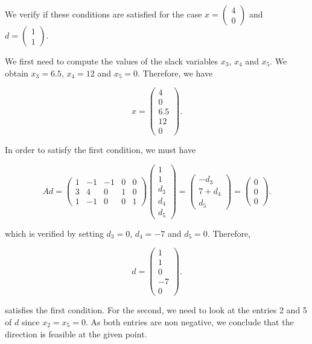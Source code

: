\begin{enumerate}
  We verify if these conditions are satisfied for the case  $x= \begin{pmatrix}
    4 \\
    0
  \end{pmatrix}$
  and
  $d=  \begin{pmatrix}
    1 \\
    1
  \end{pmatrix}.$

  We first need to compute the values of the slack variables $x_3$,  $x_4$
  and $x_5$. We obtain $x_3 = 6.5$,  $x_4= 12$ and $x_5=0$. Therefore, we have

  $$
  x = \begin{pmatrix}
    4 \\
    0 \\
    6.5\\
    12\\
    0
  \end{pmatrix}.
  $$

  In order to satisfy the first condition, we must have

  \[
  A d =
  \begin{pmatrix}
    1 & -1 & -1 & 0 & 0 \\
    3 & 4 & 0 & 1 & 0\\
    1 & -1 & 0 & 0 & 1
  \end{pmatrix}
  \begin{pmatrix}
    1 \\
    1 \\
    d_3\\
    d_4\\
    d_5
  \end{pmatrix} =
  \begin{pmatrix}
    - d_3 \\
    7+d_4 \\
    d_5
  \end{pmatrix}=
  \begin{pmatrix}
    0 \\
    0 \\
    0
  \end{pmatrix}.
  \]

  which is verified by setting $d_3 = 0$, $d_4 = -7$ and  $d_5 = 0$. Therefore, %

  $$
  d = \begin{pmatrix}
    1 \\
    1 \\
    0 \\
    -7 \\
    0
  \end{pmatrix}.
  $$

  satisfies the first condition. For the second, we need to look at the
  entries 2 and 5 of $d$ since $ x_2 = x_5 = 0$. As both entries are non negative,
  we conclude that the direction is feasible at the given point.

\end{enumerate}
